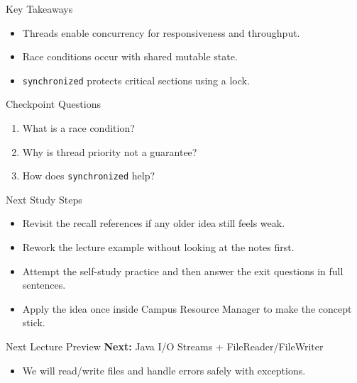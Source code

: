 \documentclass{beamer}
\begin{document}
\begin{frame}{Key Takeaways}
  \begin{itemize}[<+->]
    \item Threads enable concurrency for responsiveness and throughput.
    \item Race conditions occur with shared mutable state.
    \item \texttt{synchronized} protects critical sections using a lock.
  \end{itemize}
  \slidesources{\OOPSUnitIIISources}
\end{frame}

\begin{frame}{Checkpoint Questions}
  \begin{enumerate}[<+->]
    \item What is a race condition?
    \item Why is thread priority not a guarantee?
    \item How does \texttt{synchronized} help?
  \end{enumerate}
  \slidesources{\OOPSUnitIIISources}
\end{frame}

\begin{frame}{Next Study Steps}
\begin{itemize}[<+->]
  \item Revisit the recall references if any older idea still feels weak.
  \item Rework the lecture example without looking at the notes first.
  \item Attempt the self-study practice and then answer the exit questions in full sentences.
  \item Apply the idea once inside Campus Resource Manager to make the concept stick.
\end{itemize}
  \slidesources{\OOPSUnitIIISources}
\end{frame}

\begin{frame}{Next Lecture Preview}
  \textbf{Next:} Java I/O Streams + FileReader/FileWriter
  \vspace{0.6em}
  \begin{itemize}[<+->]
    \item We will read/write files and handle errors safely with exceptions.
  \end{itemize}
  \slidesources{\OOPSUnitIIISources}
\end{frame}
\end{document}
